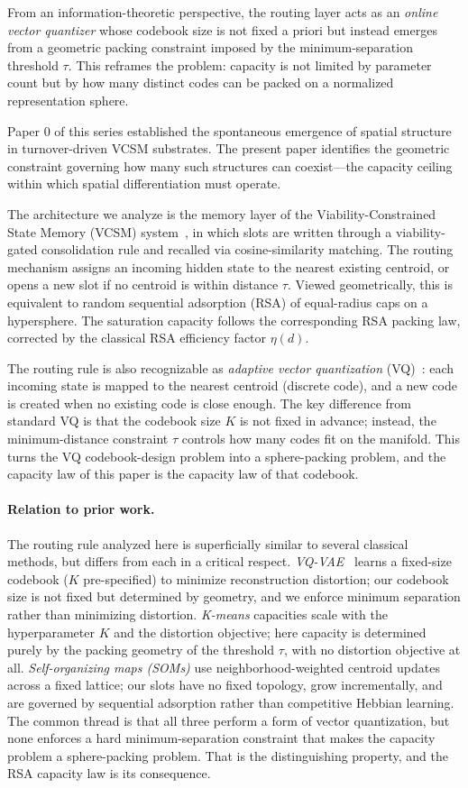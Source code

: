 \documentclass[11pt]{article}
\begin{document}
From an information-theoretic perspective, the routing layer acts as an \emph{online vector quantizer} whose codebook size is not fixed a priori but instead emerges from a geometric packing constraint imposed by the minimum-separation threshold $\tau$. This reframes the problem: capacity is not limited by parameter count but by how many distinct codes can be packed on a normalized representation sphere.

Paper 0 of this series established the spontaneous emergence of spatial structure in turnover-driven VCSM substrates. The present paper identifies the geometric constraint governing how many such structures can coexist---the capacity ceiling within which spatial differentiation must operate.

The architecture we analyze is the memory layer of the Viability-Constrained
State Memory (VCSM) system~\cite{paper1}, in which slots are written
through a viability-gated consolidation rule and recalled via cosine-similarity
matching.
The routing mechanism assigns an incoming hidden state to the nearest
existing centroid, or opens a new slot if no centroid is within distance $\tau$.
Viewed geometrically, this is equivalent to random sequential adsorption
(RSA) of equal-radius caps on a hypersphere.
The saturation capacity follows the corresponding RSA packing law, corrected
by the classical RSA efficiency factor $\eta(d)$.

The routing rule is also recognizable as \emph{adaptive vector quantization}
(VQ)~\cite{vq_vae}: each incoming state is mapped to the nearest centroid
(discrete code), and a new code is created when no existing code is close enough.
The key difference from standard VQ is that the codebook size $K$ is not
fixed in advance; instead, the minimum-distance constraint $\tau$ controls
how many codes fit on the manifold.
This turns the VQ codebook-design problem into a sphere-packing problem,
and the capacity law of this paper is the capacity law of that codebook.

\paragraph{Relation to prior work.}
The routing rule analyzed here is superficially similar to several classical methods, but differs from each in a critical respect.
\emph{VQ-VAE}~\cite{vq_vae} learns a fixed-size codebook ($K$ pre-specified) to minimize reconstruction distortion; our codebook size is not fixed but determined by geometry, and we enforce minimum separation rather than minimizing distortion.
\emph{K-means} capacities scale with the hyperparameter $K$ and the distortion objective; here capacity is determined purely by the packing geometry of the threshold $\tau$, with no distortion objective at all.
\emph{Self-organizing maps (SOMs)} use neighborhood-weighted centroid updates across a fixed lattice; our slots have no fixed topology, grow incrementally, and are governed by sequential adsorption rather than competitive Hebbian learning.
The common thread is that all three perform a form of vector quantization, but none enforces a hard minimum-separation constraint that makes the capacity problem a sphere-packing problem.
That is the distinguishing property, and the RSA capacity law is its consequence.
\end{document}
